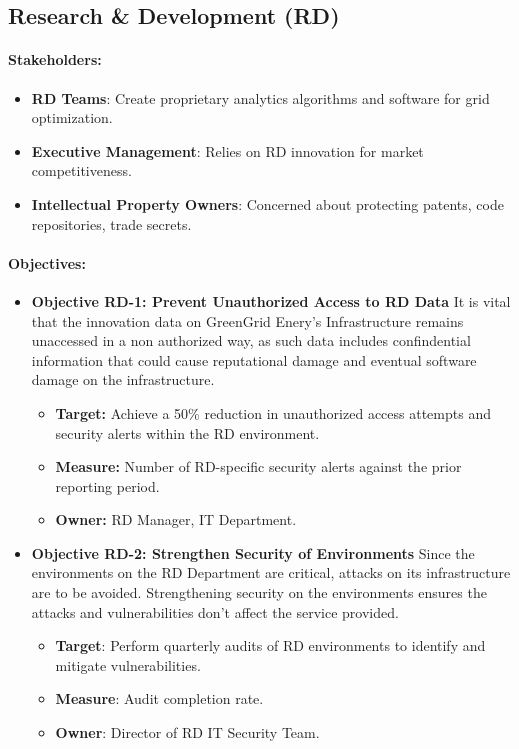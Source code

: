 \subsection{Research \& Development (RD)}
\paragraph{Stakeholders:}
\begin{itemize}
      \item \textbf{\ac{RD} Teams}: Create proprietary analytics
            algorithms and software for grid optimization.
      \item \textbf{Executive Management}: Relies on \ac{RD} innovation
            for market competitiveness.
      \item \textbf{Intellectual Property Owners}: Concerned about
            protecting patents, code repositories, trade secrets.
\end{itemize}

\paragraph{Objectives:}
\begin{itemize}
      \item \textbf{Objective RD-1: Prevent Unauthorized Access to
                  \ac{RD} Data}
            It is vital that the innovation data on GreenGrid Enery's Infrastructure remains unaccessed in a non authorized way,
            as such data includes confindential information that could cause reputational damage and eventual software damage on the infrastructure.
            \begin{itemize}
                  \item \textbf{Target:} Achieve a 50\% reduction in unauthorized
                        access attempts and security alerts within the \ac{RD}
                        environment.
                  \item \textbf{Measure:} Number of \ac{RD}-specific security
                        alerts against the prior reporting period.
                  \item \textbf{Owner:} \ac{RD} Manager, \ac{IT} Department.
            \end{itemize}
      \item \textbf{Objective RD-2: Strengthen Security of Environments}
            Since the environments on the \ac{RD} Department are critical, attacks on its infrastructure are to be avoided.
            Strengthening security on the environments ensures the attacks and vulnerabilities don't affect the service provided.
            \begin{itemize}
                  \item \textbf{Target}: Perform quarterly audits of \ac{RD} environments to identify and mitigate vulnerabilities.
                  \item \textbf{Measure}: Audit completion rate.
                  \item \textbf{Owner}: Director of \ac{RD} \ac{IT} Security Team.
            \end{itemize}
\end{itemize}